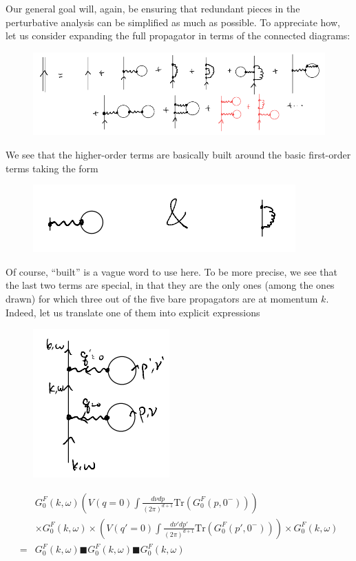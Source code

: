 Our general goal will, again, be ensuring that redundant pieces in the perturbative analysis can be simplified as much as possible. To appreciate how, let us consider expanding the full propagator in terms of the connected diagrams:
\begin{figure}[H]
    \centering
    \includegraphics[width=\textwidth]{jupyterbook/data/fig/lec18-fig05.png}
\end{figure}
We see that the higher-order terms are basically built around the basic first-order terms taking the form
\begin{figure}[H]
    \centering
    \includegraphics{jupyterbook/data/fig/lec18-fig06.png}
\end{figure}
Of course, ``built'' is a vague word to use here. To be more precise, we see that the last two terms are special, in that they are the only ones (among the ones drawn) for which three out of the five bare propagators are at momentum $k$. Indeed, let us translate one of them into explicit expressions
\begin{figure}[H]
    \centering
    \includegraphics{jupyterbook/data/fig/lec18-fig07.png}
\end{figure}
\begin{align*}
    &G_{0}^{F}\left( k,\omega \right) \left( V\left( q=0 \right) \int{\frac{d\nu dp}{\left( 2\pi \right) ^{d+1}}\mathrm{Tr}\left( G_{0}^{F}\left( p,0^- \right) \right)} \right) \\
    &\times G_{0}^{F}\left( k,\omega \right) \times \left( V\left( q'=0 \right) \int{\frac{d\nu 'dp'}{\left( 2\pi \right) ^{d+1}}\mathrm{Tr}\left( G_{0}^{F}\left( p',0^- \right) \right)} \right) \times G_{0}^{F}\left( k,\omega \right) \\
    =&G_{0}^{F}\left( k,\omega \right) \blacksquare G_{0}^{F}\left( k,\omega \right) \blacksquare G_{0}^{F}\left( k,\omega \right)
\end{align*}
